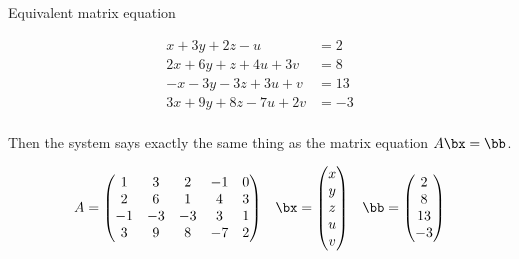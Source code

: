 \documentclass{beamer}
\begin{document}
\begin{frame}{Equivalent matrix equation}

\begin{align*}
 x + 3y + 2z - u  \qquad &= 2 \\
2x + 6y + z + 4u + 3v  &= 8 \\
-x -3y  -3z + 3u + v  &= 13 \\
3x + 9y + 8z  -7u + 2v  &= -3 \\
\end{align*}

Then the system says exactly the same thing as the matrix equation $A \bx = \bb$.

$$
\begin{matrix}
A =
\begin{pmatrix}
1 & 3 & 2 & -1 & 0 \\
2 & 6 & 1 & 4 & 3\\
-1 & -3 & -3 & 3 & 1 \\
3 & 9 & 8 & -7 & 2
\end{pmatrix}
&
\bx =
\begin{pmatrix}
x \\ y \\ z \\ u \\ v
\end{pmatrix}
&
\bb =
\begin{pmatrix}
2 \\ 8 \\ 13 \\ -3
\end{pmatrix}
\end{matrix}
$$

\end{frame}

\end{document}
